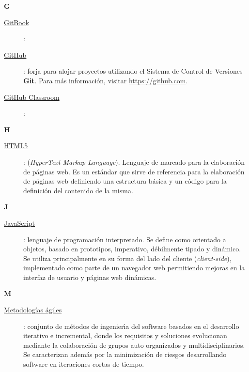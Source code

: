 {\bfseries {\Huge G}}\label{Apendice1:G}
\bigskip
\bigskip

\begin{description}
  \item[\underline{GitBook}\label{apend1:gitbook}]: 
  \bigskip
\end{description}

\begin{description}
  \item[\underline{GitHub}\label{apend1:github}]: forja para alojar proyectos utilizando el Sistema de Control de Versiones {\bfseries Git}. Para m\'as informaci\'on, visitar {\small 
  \url{https://github.com}}.
  \bigskip
\end{description}

\begin{description}
  \item[\underline{GitHub Classroom}\label{apend1:github-classroom}]:
  \bigskip
\end{description}

\bigskip
{\bfseries {\Huge H}}\label{Apendice1:H}
\bigskip
\bigskip

\begin{description}
  \item[\underline{HTML5}\label{apend1:html}]: (\textit{HyperText Markup Language}). Lenguaje de marcado para la elaboraci\'on de p\'aginas web. Es un est\'andar que sirve de referencia para la 
  elaboraci\'on de p\'aginas web definiendo una estructura b\'asica y un c\'odigo para la definici\'on del contenido de la misma.
  \bigskip
\end{description}

\bigskip
\newpage

{\bfseries {\Huge J}}\label{Apendice1:J}
\bigskip
\bigskip

\begin{description}
  \item[\underline{JavaScript}\label{apend1:js}]: lenguaje de programaci\'on interpretado. Se define como orientado a objetos, basado en prototipos, imperativo, d\'ebilmente tipado y 
  din\'amico. Se utiliza principalmente en su forma del lado del cliente (\textit{client-side}), implementado como parte de un navegador web permitiendo mejoras en la interfaz de usuario y p\'aginas 
web din\'amicas.
  \bigskip
\end{description}

\bigskip
{\bfseries {\Huge M}}\label{Apendice1:M}
\bigskip
\bigskip

\begin{description}
  \item[\underline{Metodologías ágiles}\label{apend1:ma}]: conjunto de m\'etodos de ingenier\'{\i}a del software basados en el desarrollo iterativo e incremental, donde los requisitos y 
  soluciones evolucionan mediante la colaboraci\'on de grupos auto organizados y multidisciplinarios. Se caracterizan adem\'as por la minimizaci\'on de riesgos desarrollando software en
  iteraciones cortas de tiempo.
  \bigskip
\end{description}

